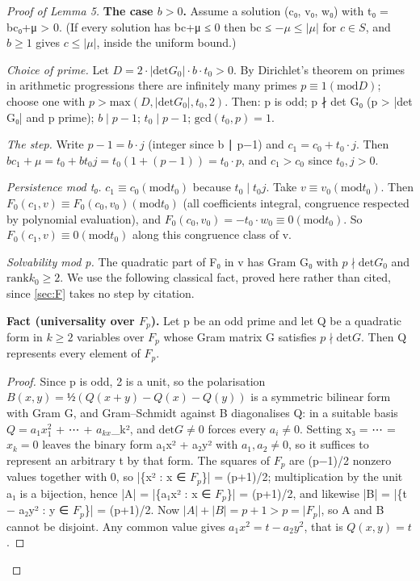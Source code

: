 \begin{proof}[Proof of Lemma 5]
\textbf{The case $b > 0$.} Assume a solution (c₀, v₀, w₀) with t₀ = bc₀+μ > 0. (If every solution has bc+μ ≤ 0 then bc ≤ $−μ ≤ |μ|$ for $c ∈ S$, and $b ≥ 1$ gives $c ≤ |μ|$, inside the uniform bound.)

\emph{Choice of prime.} Let $D = 2·|\mathrm{det} G_{0}|·b·t_{0} > 0$. By Dirichlet's theorem on primes in arithmetic progressions there are infinitely many primes $p ≡ 1 (\mathrm{mod} D)$; choose one with $p > \mathrm{max}(D, |\mathrm{det} G_{0}|, t_{0}, 2)$. Then: p is odd; p ∤ det G₀ (p > |det G₀| and p prime); $b ∣ p−1$; $t_{0} ∣ p−1$; $\mathrm{gcd}(t_{0}, p) = 1$.

\emph{The step.} Write $p−1 = b·j$ (integer since b ∣ p−1) and $c_{1} = c_{0} + t_{0}·j$. Then $b c_{1} + μ = t_{0} + b t_{0} j = t_{0}(1 + (p−1)) = t_{0}·p$, and $c_{1} > c_{0}$ since $t_{0}, j > 0$.

\emph{Persistence mod t₀.} $c_{1} ≡ c_{0} (\mathrm{mod} t_{0})$ because $t_{0} ∣ t_{0}j$. Take $v ≡ v_{0} (\mathrm{mod} t_{0})$. Then $F_{0}(c_{1}, v) ≡ F_{0}(c_{0}, v_{0}) (\mathrm{mod} t_{0})$ (all coefficients integral, congruence respected by polynomial evaluation), and $F_{0}(c_{0}, v_{0}) = −t_{0}·w_{0} ≡ 0 (\mathrm{mod} t_{0})$. So $F_{0}(c_{1}, v) ≡ 0 (\mathrm{mod} t_{0})$ along this congruence class of v.

\emph{Solvability mod p.} The quadratic part of F₀ in v has Gram G₀ with $p ∤ \mathrm{det} G_{0}$ and $\mathrm{rank} k_{0} ≥ 2$. We use the following classical fact, proved here rather than cited, since \cref{sec:F} takes no step by citation.

\begin{displaytext}
\textbf{Fact (universality over $F_{p}$).} Let p be an odd prime and let Q be a quadratic form in $k ≥ 2$ variables over $F_{p}$ whose Gram matrix G satisfies $p ∤ \mathrm{det} G$. Then Q represents every element of $F_{p}$.
\end{displaytext}

\begin{proof}
Since p is odd, 2 is a unit, so the polarisation $B(x,y) = ½(Q(x+y) − Q(x) − Q(y))$ is a symmetric bilinear form with Gram G, and Gram–Schmidt against B diagonalises Q: in a suitable basis $Q = a_{1}x_{1}^{2}$ + ⋯ + $a_{kx}$\_k², and $\mathrm{det} G ≠ 0$ forces every $a_{i} ≠ 0$. Setting x₃ = ⋯ = $x_{k} = 0$ leaves the binary form a₁x² + a₂y² with $a_{1}, a_{2} ≠ 0$, so it suffices to represent an arbitrary t by that form. The squares of $F_{p}$ are (p−1)/2 nonzero values together with 0, so |\{x² : x ∈ $F_{p}$\}| = (p+1)/2; multiplication by the unit a₁ is a bijection, hence |A| = |\{a₁x² : x ∈ $F_{p}$\}| = (p+1)/2, and likewise |B| = |\{t − a₂y² : y ∈ $F_{p}$\}| = (p+1)/2. Now $|A| + |B| = p + 1 > p = |F_{p}$|, so A and B cannot be disjoint. Any common value gives $a_{1}x^{2} = t − a_{2}y^{2}$, that is $Q(x, y) = t$.
\end{proof}


\end{proof}
